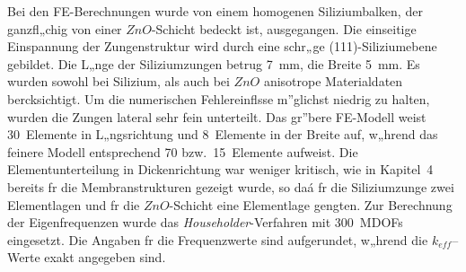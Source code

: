%
%
Bei den FE-Berechnungen wurde von einem homogenen Siliziumbalken, der
ganzfl„chig von einer $ZnO$-Schicht bedeckt ist, ausgegangen. Die einseitige
Einspannung der Zungenstruktur wird durch eine schr„ge (111)-Siliziumebene
gebildet. Die L„nge der Siliziumzungen betrug 7~mm, die Breite 5~mm.
Es wurden sowohl bei Silizium, als auch bei $ZnO$ anisotrope Materialdaten
\cite{LB82} bercksichtigt. Um die numerischen Fehlereinflsse m”glichst
niedrig zu halten, wurden die Zungen lateral sehr fein unterteilt.
Das gr”bere FE-Modell weist 30~Elemente in L„ngsrichtung und 8~Elemente in
der Breite auf, w„hrend das feinere Modell entsprechend 70 bzw.\ 15~Elemente
aufweist. Die Elementunterteilung in Dickenrichtung war weniger kritisch,
wie in Kapitel~4 bereits fr die Membranstrukturen gezeigt wurde, so daá
fr die Siliziumzunge zwei Elementlagen und fr die $ZnO$-Schicht eine
Elementlage gengten. Zur Berechnung der Eigenfrequenzen wurde das
{\sl Householder}-Verfahren mit 300~MDOFs eingesetzt. Die Angaben fr die
Frequenzwerte sind aufgerundet, w„hrend die $k_{eff}$--Werte exakt
angegeben sind.\\
